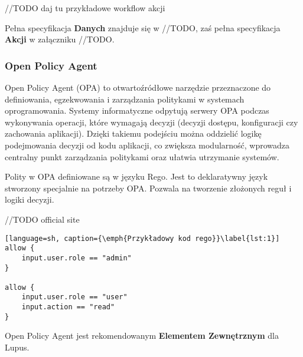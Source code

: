 //TODO daj tu przykładowe workflow akcji

Pełna specyfikacja \textbf{Danych} znajduje się w //TODO, zaś pełna specyfikacja \textbf{Akcji} w załączniku //TODO.

\subsubsection{Open Policy Agent}

Open Policy Agent (OPA) to otwartoźródłowe narzędzie przeznaczone do definiowania, egzekwowania i zarządzania politykami w systemach oprogramowania. Systemy informatyczne odpytują serwery OPA podczas wykonywania operacji, które wymagają decyzji (decyzji dostępu, konfiguracji czy zachowania aplikacji). Dzięki takiemu podejściu można oddzielić logikę podejmowania decyzji od kodu aplikacji, co zwiększa modularność, wprowadza centralny punkt zarządzania politykami oraz ułatwia utrzymanie systemów.

Polity w OPA definiowane są w języku Rego. Jest to deklaratywny język stworzony specjalnie na potrzeby OPA. Pozwala na tworzenie złożonych reguł i logiki decyzji.

//TODO official site

\begin{lstlisting}[language=sh, caption={\emph{Przykładowy kod rego}}\label{lst:1}]
allow {
    input.user.role == "admin"
}

allow {
    input.user.role == "user"
    input.action == "read"
}
\end{lstlisting}

Open Policy Agent jest rekomendowanym \textbf{Elementem Zewnętrznym} dla Lupus.